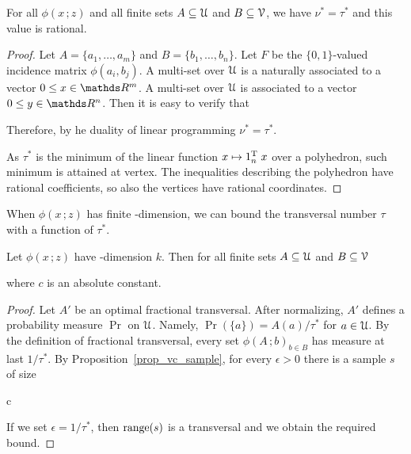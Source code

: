\documentclass[scombinatorics.tex]{subfiles}
\begin{document}
\begin{theorem}\label{thm_fractional_nu=tau}
 For all $\phi(x\,;z)$ and all finite sets $A\subseteq\EuScript U$ and $B\subseteq\EuScript V$, we have $\nu^*=\tau^*$ and this value is rational.
\end{theorem}
\begin{proof}
Let $A=\{a_1,\dots,a_m\}$ and $B=\{b_1,\dots,b_n\}$.
Let $F$ be the $\{0,1\}$-valued incidence matrix $\phi(a_i,b_j)$.
A multi-set over $\EuScript U$ is a naturally associated to a vector $0\le x\in\RR^m$.
A multi-set over $\EuScript U$ is associated to a vector $0\le y\in\RR^n$.
Then it is easy to verify that



Therefore, by he duality of linear programming $\nu^*=\tau^*$.

As $\tau^*$ is the minimum of the linear function $x\mapsto 1_n^{\rm T}\;x$ over a polyhedron, such minimum is attained at vertex.
The inequalities describing the polyhedron have rational coefficients, so also the vertices have rational coordinates.
\end{proof}

When $\phi(x\,;z)$ has finite \vc-dimension, we can bound the transversal number $\tau$ with a function of $\tau^*$. 

\begin{proposition}\label{prop_bound_fractional_trans}
  Let $\phi(x\,;z)$ have \vc-dimension $k$.
  Then for all finite sets $A\subseteq\EuScript U$ and $B\subseteq\EuScript V$
  
  
  where $c$ is an absolute constant.
\end{proposition}
  
\begin{proof}
  Let $A'$ be an optimal fractional transversal.
  After normalizing, $A'$ defines a probability measure $\Pr$ on $\EuScript U$.
  Namely, $\Pr(\{a\})=A(a)/\tau^*$ for $a\in\EuScript U$.
  By the definition of fractional transversal, every set $\phi(A\,;b)_{b\in B}$ has measure at last $1/\tau^*$.
  By Proposition~\ref{prop_vc_sample}, for every $\epsilon>0$ there is a sample $s$ of size
  
  {\le}
  {c\,\log{}}

  If we set $\epsilon=1/\tau^*$, then $\mathop{\rm range}(s)$ is a transversal and we obtain the required bound.
\end{proof}
\end{document}
